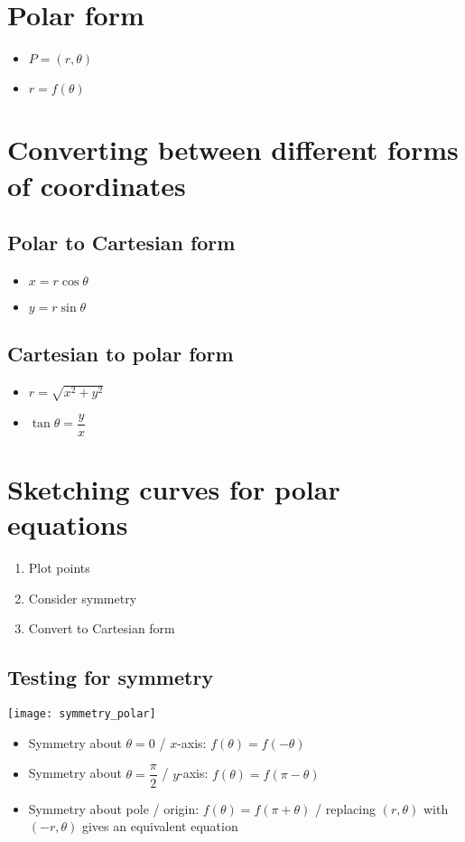 \section{Polar form}
\begin{itemize}
	\item $P=(r,\theta)$
	\item $r=f(\theta)$
\end{itemize}

\section{Converting between different forms of coordinates}
\subsection{Polar to Cartesian form}
\begin{itemize}
	\item $x=r\cos\theta$
	\item $y=r\sin\theta$
\end{itemize}
\subsection{Cartesian to polar form}
\begin{itemize}
	\item $r=\sqrt{x^2+y^2}$
	\item $\tan\theta=\dfrac{y}{x}$
\end{itemize}


\section{Sketching curves for polar equations}
\begin{enumerate}
	\item Plot points
	\item Consider symmetry
	\item Convert to Cartesian form
\end{enumerate}

\subsection{Testing for symmetry}
\texttt{[image: symmetry\_polar]}
\begin{itemize}
	\item Symmetry about $\theta=0$ / $x$-axis: $f(\theta)=f(-\theta)$
	\item Symmetry about $\theta=\dfrac{\pi}{2}$ / $y$-axis: $f(\theta)=f(\pi-\theta)$
	\item Symmetry about pole / origin: $f(\theta)=f(\pi+\theta)$ / replacing $(r,\theta)$ with $(-r,
	\theta)$ gives an equivalent equation
\end{itemize}


